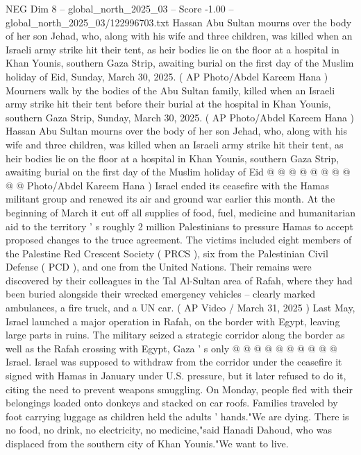 \begin{textsample}{NEG Dim 8 – global\_north\_2025\_03 – Score -1.00 – global\_north\_2025\_03/122996703.txt}  \label{ex:f8_neg_125}
Hassan Abu Sultan mourns over the body of her son Jehad, who, along with his wife and three children, was killed when an Israeli army strike hit their tent, as heir bodies lie on the floor at a hospital in Khan Younis, southern Gaza Strip, awaiting burial on the first day of the Muslim holiday of Eid, Sunday, March 30, 2025. ( AP Photo/Abdel Kareem Hana ) Mourners walk by the bodies of the Abu Sultan family, killed when an Israeli army strike hit their tent before their burial at the hospital in Khan Younis, southern Gaza Strip, Sunday, March 30, 2025. ( AP Photo/Abdel Kareem Hana ) Hassan Abu Sultan mourns over the body of her son Jehad, who, along with his wife and three children, was killed when an Israeli army strike hit their tent, as heir bodies lie on the floor at a hospital in Khan Younis, southern Gaza Strip, awaiting burial on the first day of the Muslim holiday of Eid @ @ @ @ @ @ @ @ @ @ Photo/Abdel Kareem Hana ) Israel ended its ceasefire with the Hamas militant group and renewed its air and ground war earlier this month.
At the beginning of March it cut off all supplies of food, fuel, medicine and humanitarian aid to the territory ' s roughly 2 million Palestinians to pressure Hamas to accept proposed changes to the truce agreement.
The victims included eight members of the Palestine Red Crescent Society ( PRCS ), six from the Palestinian Civil Defense ( PCD ), and one from the United Nations.
Their remains were discovered by their colleagues in the Tal Al-Sultan area of Rafah, where they had been buried alongside their wrecked emergency vehicles -- clearly marked ambulances, a fire truck, and a UN car. ( AP Video / March 31, 2025 ) Last May, Israel launched a major operation in Rafah, on the border with Egypt, leaving large parts in ruins.
The military seized a strategic corridor along the border as well as the Rafah crossing with Egypt, Gaza ' s only @ @ @ @ @ @ @ @ @ @ Israel.
Israel was supposed to withdraw from the corridor under the ceasefire it signed with Hamas in January under U.S. pressure, but it later refused to do it, citing the need to prevent weapons smuggling.
On Monday, people fled with their belongings loaded onto donkeys and stacked on car roofs.
Families traveled by foot carrying luggage as children held the adults ' hands."We are dying.
There is no food, no drink, no electricity, no medicine,"said Hanadi Dahoud, who was displaced from the southern city of Khan Younis."We want to live.

\end{textsample}
